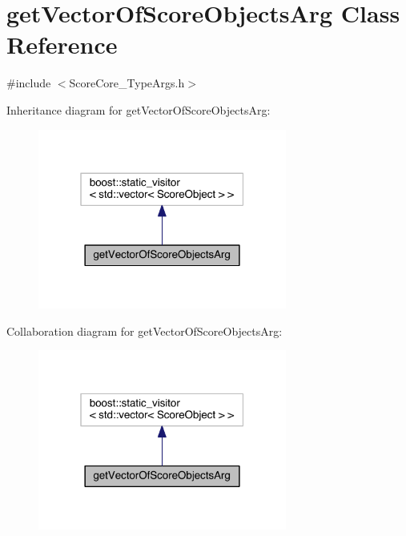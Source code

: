 \hypertarget{classget_vector_of_score_objects_arg}{\section{get\-Vector\-Of\-Score\-Objects\-Arg Class Reference}
\label{classget_vector_of_score_objects_arg}
}


{\ttfamily \#include $<$Score\-Core\-\_\-\-Type\-Args.\-h$>$}



Inheritance diagram for get\-Vector\-Of\-Score\-Objects\-Arg\-:\nopagebreak
\begin{figure}[H]
\begin{center}
\leavevmode
\includegraphics[width=232pt]{classget_vector_of_score_objects_arg__inherit__graph}
\end{center}
\end{figure}


Collaboration diagram for get\-Vector\-Of\-Score\-Objects\-Arg\-:\nopagebreak
\begin{figure}[H]
\begin{center}
\leavevmode
\includegraphics[width=232pt]{classget_vector_of_score_objects_arg__coll__graph}
\end{center}
\end{figure}
